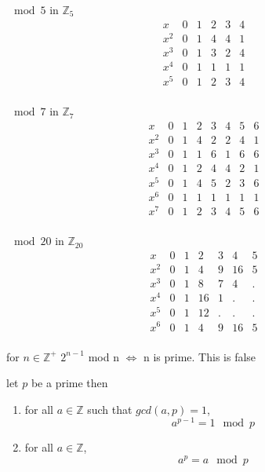 

$\mod 5$ in $\mathbb{Z}_5$
\[
\begin{array}{cccccc}
    x & 0 & 1 & 2 & 3 & 4 \\
    x^2 & 0 & 1 & 4 & 4 & 1 \\
    x^3 & 0 & 1 & 3 & 2 & 4 \\
    x^4 & 0 & 1 & 1 & 1 & 1 \\
    x^5 & 0 & 1 & 2 & 3 & 4 \\
\end{array}
\]

$\mod 7$ in $\mathbb{Z}_7$
\[
\begin{array}{cccccccc}
    x & 0 & 1 & 2 & 3 & 4 & 5 & 6 \\
    x^2 & 0 & 1 & 4 & 2 & 2 & 4 & 1 \\
    x^3 & 0 & 1 & 1 & 6 & 1 & 6 & 6 \\
    x^4 & 0 & 1 & 2 & 4 & 4 & 2 & 1 \\
    x^5 & 0 & 1 & 4 & 5 & 2 & 3 & 6 \\
    x^6 & 0 & 1 & 1 & 1 & 1 & 1 & 1 \\
    x^7 & 0 & 1 & 2 & 3 & 4 & 5 & 6 \\
\end{array}
\]

$\mod 20$ in $\mathbb{Z}_{20}$
\[
\begin{array}{ccccccc}
    x & 0 & 1 & 2 & 3 & 4 & 5\\
    x^2 & 0 & 1 & 4 & 9 & 16 & 5\\
    x^3 & 0 & 1 & 8 & 7 & 4 & .\\
    x^4 & 0 & 1 & 16 & 1 & . & .\\
    x^5 & 0 & 1 & 12 & . & . & .\\
    x^6 & 0 & 1 & 4 & 9 & 16 & 5\\
\end{array}
\]


\begin{conj}
    for $n \in \mathbb{Z}^+$
    $2^{n-1}$ mod n $\iff$ n is prime. This is false
\end{conj}

\begin{thm}
let $p$ be a prime then
    \begin{enumerate}
        \item for all $a\in \mathbb{Z}$ such that $gcd(a,p) = 1$, \[a^{p-1} = 1 \mod p\]
        \item for all $a\in \mathbb{Z}$, \[a^p  = a \mod p\]
    \end{enumerate}
\end{thm}

